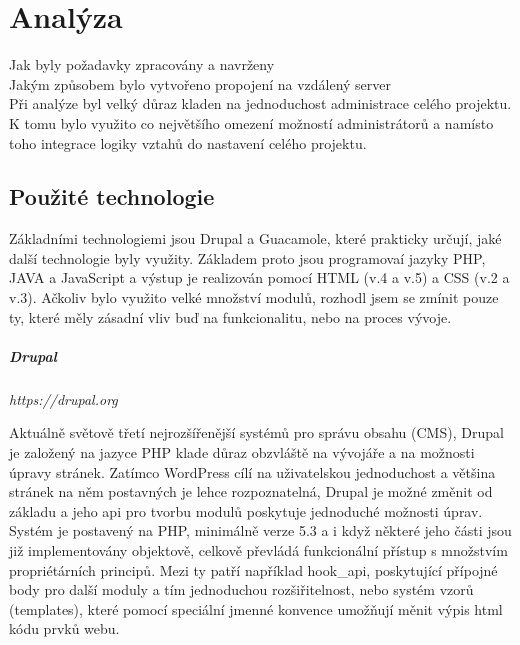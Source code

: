 \documentclass[10pt,draft,oneside]{fithesis2}
\begin{document}

\chapter{Analýza}
\label{chap:analyza}

Jak byly požadavky zpracovány a navrženy \\
Jakým způsobem bylo vytvořeno propojení na vzdálený server \\
Při analýze byl velký důraz kladen na jednoduchost administrace celého projektu. K tomu bylo využito co největšího omezení možností administrátorů a namísto toho integrace logiky vztahů do nastavení celého projektu.

\section{Použité technologie}
\label{chap:technologies}

Základními technologiemi jsou Drupal a Guacamole, které prakticky určují, jaké další technologie byly využity. Základem proto jsou programovaí jazyky PHP, JAVA a JavaScript a výstup je realizován pomocí HTML (v.4 a v.5) a CSS (v.2 a v.3). Ačkoliv bylo využito velké množství modulů, rozhodl jsem se zmínit pouze ty, které měly zásadní vliv buď na funkcionalitu, nebo na proces vývoje.

\paragraph*{Drupal} \emph{https://drupal.org}

Aktuálně světově třetí nejrozšířenější\cite{website:cms-market-share} systémů pro správu obsahu (CMS), Drupal je založený na jazyce PHP klade důraz obzvláště na vývojáře a na možnosti úpravy stránek. Zatímco WordPress cílí na uživatelskou jednoduchost a většina stránek na něm postavných je lehce rozpoznatelná, Drupal je možné změnit od základu a jeho \gls{api} pro tvorbu modulů poskytuje jednoduché možnosti úprav. Systém je postavený na PHP, minimálně verze 5.3 a i když některé jeho části jsou již implementovány objektově, celkově převládá funkcionální přístup s množstvím propriétárních principů. Mezi ty patří například hook\_api, poskytující přípojné body pro další moduly a tím jednoduchou rozšiřitelnost, nebo systém vzorů (templates), které pomocí speciální jmenné konvence umožňují měnit výpis html kódu prvků webu.
\end{document}
